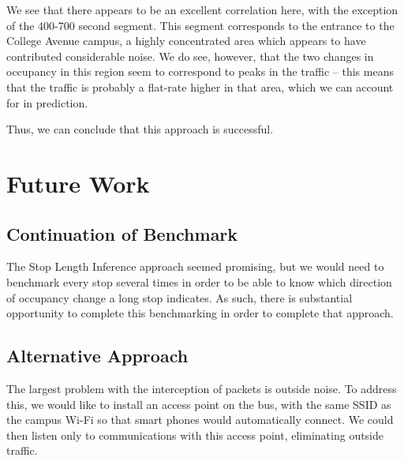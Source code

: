 \documentclass[11pt,journal,compsoc]{IEEEtran} %
\begin{document}
		We see that there appears to be an excellent correlation here, with the exception of the 400-700 second segment. %
		This segment corresponds to the entrance to the College Avenue campus, a highly concentrated area which appears to have contributed considerable noise.
		We do see, however, that the two changes in occupancy in this region seem to correspond to peaks in the traffic -- this means that the traffic is probably a flat-rate higher in that area, which we can account for in prediction.
		
		Thus, we can conclude that this approach is successful. %


\section{Future Work}
    
\subsection*{Continuation of Benchmark}
	The Stop Length Inference approach seemed promising, but we would need to benchmark every stop several times in order to be able to know which direction of occupancy change a long stop indicates.
    As such, there is substantial opportunity to complete this benchmarking in order to complete that approach.

\subsection*{Alternative Approach}
	The largest problem with the interception of packets is outside noise.
	To address this, we would like to install an access point on the bus, with the same SSID as the campus Wi-Fi so that smart phones would automatically connect.
	We could then listen only to communications with this access point, eliminating outside traffic.
	
\end{document}
